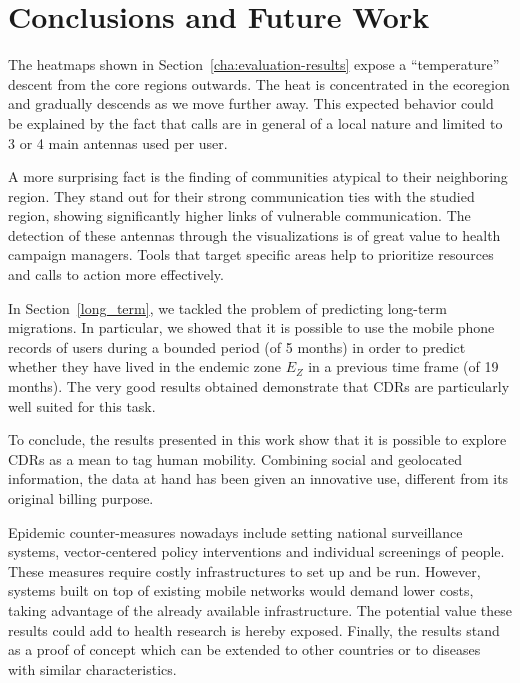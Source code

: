 
\chapter{Conclusions and Future Work}
\label{cha:conclusions}

The heatmaps shown in Section~\cref{cha:evaluation-results} expose a ``temperature'' descent from the core regions outwards. The heat is concentrated in the ecoregion and gradually descends as we move further away. This expected behavior could be explained by the fact that calls are in general of a local nature and limited to 3 or 4 main antennas used per user. 

A more surprising fact is the finding of communities atypical to their neighboring region. They stand out for their strong communication ties with the studied region, showing significantly higher links of vulnerable communication. The detection of these antennas through the visualizations is of great value to health campaign managers. Tools that target specific areas help to prioritize resources and calls to action more effectively.

In Section~\cref{long_term}, we tackled the problem of predicting long-term migrations. In particular, we showed that it is possible to use the mobile phone records of users during a bounded period (of 5 months) in order to predict whether they have lived in the endemic zone $E_Z$ in a previous time frame (of 19 months).
The very good results obtained demonstrate that CDRs are particularly well suited for this task.

To conclude, the results presented in this work show that it is possible to explore CDRs as a mean to tag human mobility. Combining social and geolocated information, the data at hand has been given an innovative use, different from its original billing purpose.

Epidemic counter-measures nowadays include setting national surveillance systems, vector-centered policy interventions and individual screenings of people. These measures require costly infrastructures to set up and be run. However, systems built on top of existing mobile networks would demand lower costs, taking advantage of the already available infrastructure. The potential value these results could add to health research is hereby exposed.
Finally, the results stand as a proof of concept which can be extended to other countries or to diseases with similar characteristics.



